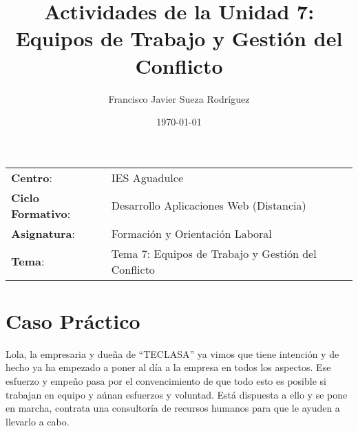 


\title{
\vspace{10ex}
\normalfont \normalsize
\huge \textbf{Actividades de la Unidad 7: Equipos de Trabajo y Gestión del Conflicto}
}
\author{Francisco Javier Sueza Rodríguez}
\date{\normalsize\today}



\maketitle

\thispagestyle{empty}

\vspace{65ex}

\begin{center}
    \begin{tabular}{l l}
        \textbf{Centro}: & IES Aguadulce \\
        \textbf{Ciclo Formativo}: & Desarrollo Aplicaciones Web (Distancia)\\
        \textbf{Asignatura}: & Formación y Orientación Laboral\\
        \textbf{Tema}: & Tema 7: Equipos de Trabajo y Gestión del Conflicto\\
    \end{tabular}
\end{center}

\newpage

\tableofcontents

\newpage
\section{Caso Práctico}
Lola, la empresaria y dueña de ``TECLASA'' ya vimos que tiene intención y de hecho ya ha empezado a poner al día a la empresa en todos los aspectos. Ese esfuerzo y empeño pasa por el convencimiento de que todo esto es posible si trabajan en equipo y aúnan esfuerzos y voluntad. Está dispuesta a ello y se pone en marcha, contrata una consultoría de recursos humanos para que le ayuden a llevarlo a cabo.

